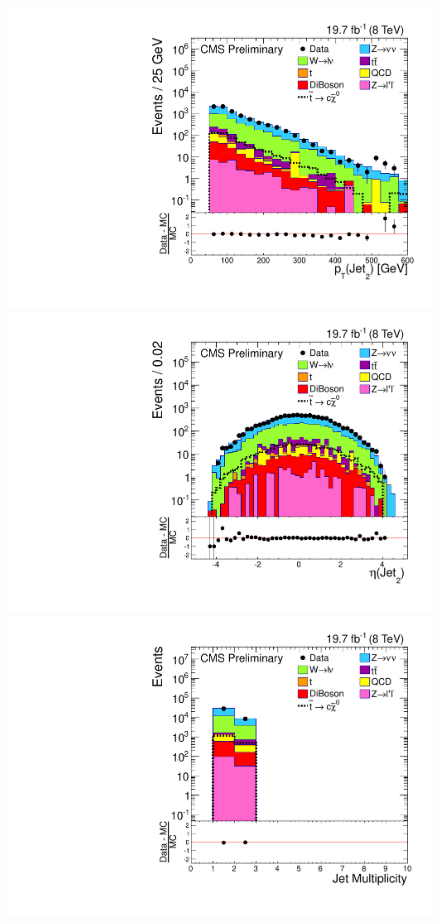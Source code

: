 \begin{figure}
\begin{center}
  \includegraphics[scale=0.32]     {Figures/sus13009/cut/Jet2Pt.pdf}
  \includegraphics[scale=0.32]     {Figures/sus13009/cut/Jet2Eta.pdf}
   \includegraphics[scale=0.32]     {Figures/sus13009/cut/NJet.pdf}

\end{center}
\end{figure}
